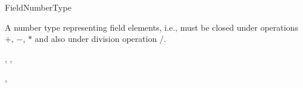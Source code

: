\begin{ccRefConcept}{FieldNumberType}

A number type representing field elements, i.e., must be closed under
operations $+$, $-$, $*$ and also under division operation $/$.

\ccRefines
{}, , 

\ccSeeAlso
{}, 
\end{ccRefConcept}
